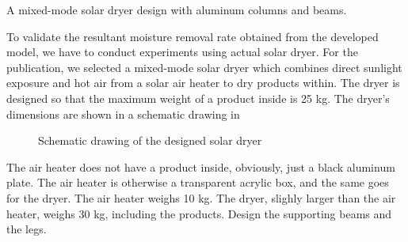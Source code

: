 \documentclass[
10pt,
a4paper,
openany,
svgnames,
]{book}
\begin{document}
\begin{example} A mixed-mode solar dryer design with aluminum columns and beams. \cite{akamphon2018integrated} 

  To validate the resultant moisture removal rate obtained from the developed model, we have to conduct experiments using actual solar dryer. For the publication, we selected a mixed-mode solar dryer which combines direct sunlight exposure and hot air from a solar air heater to dry products within. The dryer is designed so that the maximum weight of a product inside is 25 kg. The dryer's dimensions are shown in a schematic drawing in  
  
  \begin{figure}[H]
    \centering
    \caption{Schematic drawing of the designed solar dryer}
    \label{fig: solar dryer}
  \end{figure}

  The air heater does not have a product inside, obviously, just a black aluminum plate. The air heater is otherwise a transparent acrylic box, and the same goes for the dryer. The air heater weighs 10 kg. The dryer, slighly larger than the air heater, weighs 30 kg, including the products. Design the supporting beams and the legs.
\end{example}
\end{document}
